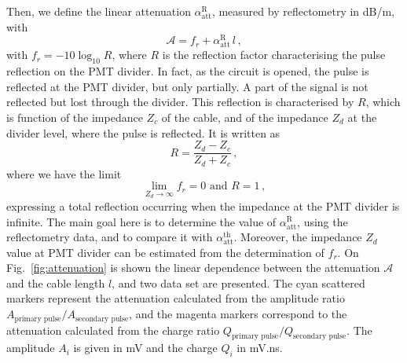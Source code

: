 Then, we define the linear attenuation $\alpha_{\text{att}}^{\text{R}}$, measured by reflectometry in dB/m, with
\begin{equation}
  \mathcal{A} = f_{r}+\alpha_{\text{att}}^{\text{R}}\,l\,,
\end{equation}
with $f_{r} = -10\log_{10}R$, where $R$ is the reflection factor characterising the pulse reflection on the PMT divider.
In fact, as the circuit is opened, the pulse is reflected at the PMT divider, but only partially.
A part of the signal is not reflected but lost through the divider.
This reflection is characterised by $R$, which is function of the impedance $Z_{c}$ of the cable, and of the impedance $Z_{d}$ at the divider level, where the pulse is reflected.
It is written as
\begin{equation}
  R = \frac{Z_{d}-Z_{c}}{Z_{d}+Z_{c}}\,,
\end{equation}
where we have the limit
\begin{equation}
  \lim_{Z_{d} \to \infty} f_{r} = 0 \text{ and } R=1\,,
\end{equation}
expressing a total reflection occurring when the impedance at the PMT divider is infinite.
The main goal here is to determine the value of $\alpha_{\text{att}}^{\text{R}}$, using the reflectometry data, and to compare it with $\alpha_{\text{att}}^{\text{th}}$.
Moreover, the impedance $Z_{d}$ value at PMT divider can be estimated from the determination of $f_{r}$.
On Fig.~\ref{fig:attenuation} is shown the linear dependence between the attenuation $\mathcal{A}$ and the cable length $l$, and two data set are presented.
The cyan scattered markers represent the attenuation calculated from the amplitude ratio $A_{\text{primary pulse}}/A_{\text{secondary pulse}}$, and the magenta markers correspond to the attenuation calculated from the charge ratio $Q_{\text{primary pulse}}/Q_{\text{secondary pulse}}$.
 The amplitude $A_{i}$ is given in mV and the charge $Q_{i}$ in mV.ns.

